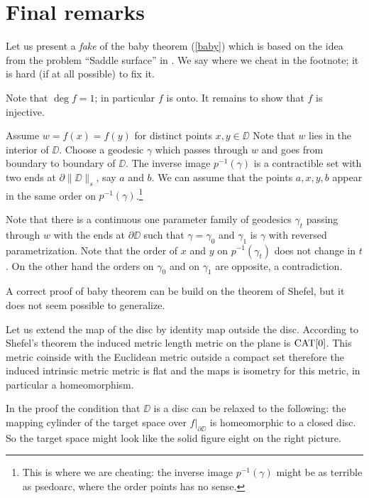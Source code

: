 \documentclass{article}
\begin{document}
\section{Final remarks}

Let us present a \emph{fake} of the baby theorem (\ref{baby}) which is based on the idea from the problem ``Saddle surface'' in \cite{petrunin-orthodox}.
We say where we cheat in the footnote; 
it is hard (if at all possible) to fix it.

Note that  $\deg f=1$;
in particular $f$ is onto.
It remains to show that $f$ is injective.

Assume  $w=f(x)=f(y)$ for distinct points $x,y\in\DD$
Note that  $w$ lies in the interior of $\DD$.
Choose a geodesic $\gamma$ which passes through $w$ and goes 
from boundary to boundary of $\DD$.
The inverse image $p^{-1}(\gamma)$ is a contractible set with two ends at $\partial\|\DD\|_s$, say $a$ and $b$.
We can assume that the points $a,x,y,b$ appear in the same order on $p^{-1}(\gamma)$.\footnote{This is where we are cheating: the inverse image $p^{-1}(\gamma)$ might be as terrible as psedoarc, where the order points has no sense.}

Note that there is a continuous one parameter family of geodesics $\gamma_t$ passing through $w$ with the ends at $\partial \DD$
such that $\gamma=\gamma_0$ and $\gamma_1$ is $\gamma$ with reversed parametrization.
Note that the order of $x$ and $y$ on $p^{-1}(\gamma_t)$ does not change in $t$.
On the other hand the orders on $\gamma_0$ and on $\gamma_1$ are opposite, a contradiction.\qeds

A correct proof of baby theorem can be build on the theorem of Shefel, but it does not seem possible to generalize.

Let us extend the map of the disc by identity map outside the disc. 
According to Shefel's theorem the induced metric length metric on the plane is $\mathop{\rm CAT}\nolimits[0]$.
This metric coinside with the Euclidean metric outside a compact set therefore the induced intrinsic metric metric is flat and the maps is isometry for this metric, in particular a homeomorphism.\qeds


In the proof the condition that $\DD$ is a disc can be relaxed to the following:
the mapping cylinder of the target space over $f|_{\partial\DD}$ is homeomorphic to a closed disc.
So the target space might look like the solid figure eight on the right picture.
\end{document}

